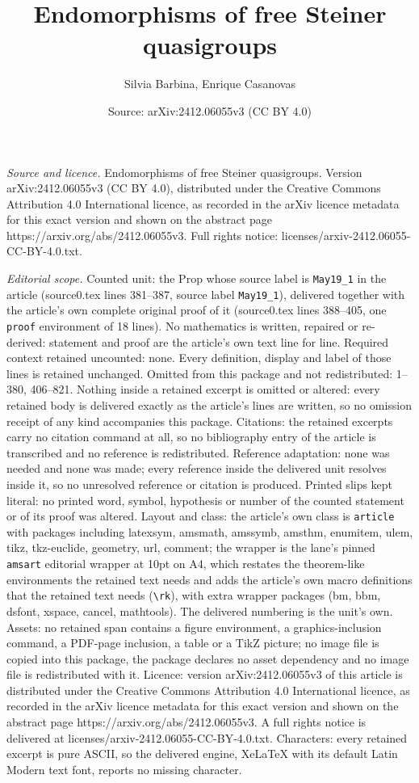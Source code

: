\documentclass[10pt,a4paper]{amsart}
\title[Endomorphisms of free Steiner quasigroups]{Endomorphisms of free Steiner quasigroups}
\author{Silvia Barbina, Enrique Casanovas}
\date{Source: arXiv:2412.06055v3 (CC BY 4.0)}
\begin{document}
\maketitle

\noindent\emph{Source and licence.} Endomorphisms of free Steiner quasigroups. Version arXiv:2412.06055v3 (CC BY 4.0), distributed under the Creative Commons Attribution 4.0 International licence, as recorded in the arXiv licence metadata for this exact version and shown on the abstract page https://arxiv.org/abs/2412.06055v3. Full rights notice: licenses/arxiv-2412.06055-CC-BY-4.0.txt.\par\smallskip

\noindent\textit{Editorial scope.} Counted unit: the Prop whose source label is \texttt{May19\_1} in the article (source0.tex lines 381--387, source label \texttt{May19\_1}), delivered together with the article's own complete original proof of it (source0.tex lines 388--405, one \texttt{proof} environment of 18 lines). No mathematics is written, repaired or re-derived: statement and proof are the article's own text line for line. Required context retained uncounted: none. Every definition, display and label of those lines is retained unchanged. Omitted from this package and not redistributed: 1--380, 406--821. Nothing inside a retained excerpt is omitted or altered: every retained body is delivered exactly as the article's lines are written, so no omission receipt of any kind accompanies this package. Citations: the retained excerpts carry no citation command at all, so no bibliography entry of the article is transcribed and no reference is redistributed. Reference adaptation: none was needed and none was made; every reference inside the delivered unit resolves inside it, so no unresolved reference or citation is produced. Printed slips kept literal: no printed word, symbol, hypothesis or number of the counted statement or of its proof was altered. Layout and class: the article's own class is \texttt{article} with packages including latexsym, amsmath, amssymb, amsthm, enumitem, ulem, tikz, tkz-euclide, geometry, url, comment; the wrapper is the lane's pinned \texttt{amsart} editorial wrapper at 10pt on A4, which restates the theorem-like environments the retained text needs and adds the article's own macro definitions that the retained text needs (\texttt{\textbackslash rk}), with extra wrapper packages (bm, bbm, dsfont, xspace, cancel, mathtools). The delivered numbering is the unit's own. Assets: no retained span contains a figure environment, a graphics-inclusion command, a PDF-page inclusion, a table or a TikZ picture; no image file is copied into this package, the package declares no asset dependency and no image file is redistributed with it. Licence: version arXiv:2412.06055v3 of this article is distributed under the Creative Commons Attribution 4.0 International licence, as recorded in the arXiv licence metadata for this exact version and shown on the abstract page https://arxiv.org/abs/2412.06055v3. A full rights notice is delivered at licenses/arxiv-2412.06055-CC-BY-4.0.txt. Characters: every retained excerpt is pure ASCII, so the delivered engine, XeLaTeX with its default Latin Modern text font, reports no missing character.
\end{document}
